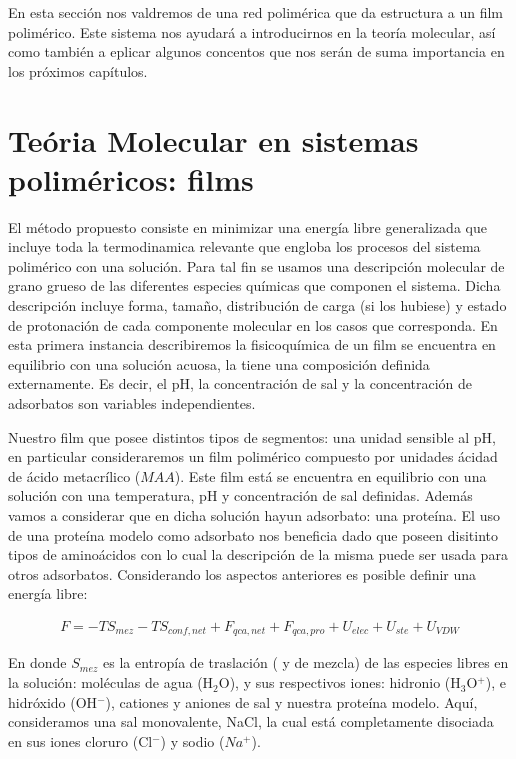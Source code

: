 En esta secci\'on nos valdremos de una  red polim\'erica que da estructura a un film polim\'erico. Este sistema nos ayudar\'a a introducirnos en la teor\'ia molecular, as\'i como tambi\'en a eplicar algunos concentos que nos ser\'an de suma importancia en los pr\'oximos cap\'itulos.

\section{Te\'oria Molecular en sistemas polim\'ericos: films} \label{sec:film-teoria}

El m\'etodo propuesto consiste en minimizar una energ\'ia libre generalizada que incluye toda la termodinamica relevante que engloba los procesos del sistema polim\'erico con una soluci\'on.
Para tal fin se usamos  una descripci\'on molecular de grano grueso de las diferentes especies qu\'imicas que componen el sistema.
Dicha descripci\'on incluye forma, tama\~no, distribuci\'on de carga (si los hubiese) y estado de protonaci\'on de cada componente molecular en los casos que corresponda.
En esta primera instancia describiremos la fisicoqu\'imica de un film  se encuentra en  equilibrio con una solución acuosa, la tiene una composición  definida externamente.
Es decir, el pH, la concentración de sal y la concentraci\'on de adsorbatos son variables independientes.


Nuestro film que posee distintos tipos de segmentos: una unidad sensible al pH, en particular consideraremos un film polim\'erico compuesto por unidades \'acidad de \'acido metacr\'ilico ($MAA$).
Este film est\'a  se encuentra en equilibrio con una soluci\'on con una temperatura, pH y concentraci\'on de sal definidas. Adem\'as vamos a considerar que en dicha soluci\'on hayun adsorbato: una prote\'ina.
El uso de una prote\'ina modelo como adsorbato nos beneficia dado que poseen disitinto tipos de amino\'acidos con lo cual la descripci\'on de la misma puede ser usada para otros adsorbatos. 
Considerando los aspectos anteriores es posible definir una energ\'ia libre:

\begin{align}
 	F = -TS_{mez} -TS_{conf,net} + F_{qca,net} + F_{qca,pro} + U_{elec} + U_{ste} + U_{VDW}
 	\label{eq:film:libre-film}
\end{align}
 
\noindent En donde $S_{mez}$ es la entrop\'ia de traslaci\'on ( y de mezcla) de las especies libres en la soluci\'on: mol\'eculas de agua (H$_2$O), y sus respectivos iones:  hidronio (H$_3$O$^+$), e hidr\'oxido (OH$^- $), cationes y aniones de sal y nuestra prote\'ina modelo.
Aqu\'i, consideramos una sal monovalente, NaCl, la cual est\'a completamente disociada en sus  iones cloruro (Cl$^-$) y sodio ($Na^+$). 

